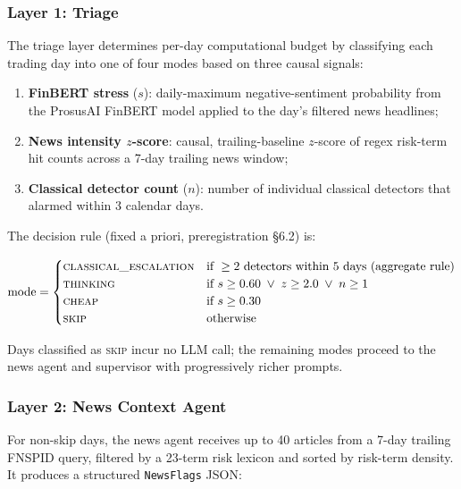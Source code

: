\documentclass[11pt,a4paper]{article}
\begin{document}
  \subsubsection{Layer 1: Triage}\label{sec:triage}

  The triage layer determines per-day computational budget by classifying each
  trading day into one of four modes based on three causal signals:

  \begin{enumerate}
    \item \textbf{FinBERT stress} ($s$): daily-maximum negative-sentiment
          probability from the ProsusAI FinBERT model applied to the day's
          filtered news headlines;
    \item \textbf{News intensity $z$-score}: causal, trailing-baseline
          $z$-score of regex risk-term hit counts across a 7-day trailing
          news window;
    \item \textbf{Classical detector count} ($n$): number of individual classical
          detectors that alarmed within 3 calendar days.
  \end{enumerate}

  \noindent The decision rule (fixed a priori, preregistration \S6.2) is:

  \[
  \text{mode} =
  \begin{cases}
  \textsc{classical\_escalation} & \text{if } \geq 2 \text{ detectors within 5 days (aggregate rule)} \\
  \textsc{thinking}              & \text{if } s \geq 0.60 \;\lor\; z \geq 2.0 \;\lor\; n \geq 1 \\
  \textsc{cheap}                 & \text{if } s \geq 0.30 \\
  \textsc{skip}                  & \text{otherwise}
  \end{cases}
  \]

  Days classified as \textsc{skip} incur no LLM call; the remaining modes proceed
  to the news agent and supervisor with progressively richer prompts.

  \subsubsection{Layer 2: News Context Agent}\label{sec:news-agent}

  For non-skip days, the news agent receives up to 40 articles from a 7-day
  trailing FNSPID query, filtered by a 23-term risk lexicon and sorted by
  risk-term density. It produces a structured \texttt{NewsFlags} JSON:
\end{document}
